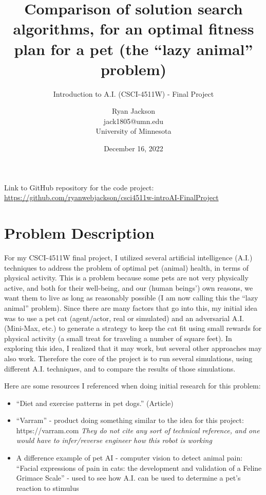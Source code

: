 \documentclass{article}
\title{Comparison of solution search algorithms, for an optimal fitness plan for a pet (the ``lazy animal'' problem)}
\subtitle{Introduction to A.I. (CSCI-4511W) - Final Project}
\author{Ryan Jackson \\ jack1805@umn.edu \\ University of Minnesota}
\date{December 16, 2022}
\begin{document}
\maketitle

Link to GitHub repository for the code project:
\href{https://github.com/ryanwebjackson/csci4511w-introAI-FinalProject}{https://github.com/ryanwebjackson/csci4511w-introAI-FinalProject} 

\section{Problem Description}

For my CSCI-4511W final project, I utilized several artificial intelligence (A.I.) techniques to address the problem of optimal pet (animal) health, in terms of physical activity. This is a problem because some pets are not very physically active, and both for their well-being, and our (human beings') own reasons, we want them to live as long as reasonably possible (I am now calling this the ``lazy animal'' problem). Since there are many factors that go into this, my initial idea was to use a pet cat (agent/actor, real or simulated) and an adversarial A.I. (Mini-Max, etc.) to generate a strategy to keep the cat fit using small rewards for physical activity (a small treat for traveling a number of square feet). In exploring this idea, I realized that it may work, but several other approaches may also work. Therefore the core of the project is to run several simulations, using different A.I. techniques, and to compare the results of those simulations.

Here are some resources I referenced when doing initial research for this problem:
\begin{itemize}
    \item ``Diet and exercise patterns in pet dogs.'' (Article) \cite{slater1995diet}
    \item ``Varram'' - product doing something similar to the idea for this project: https://varram.com \cite{varram}
    \textit{They do not cite any sort of technical reference, and one would have to infer/reverse engineer how this robot is working}
    \item A difference example of pet AI - computer vision to detect animal pain: ``Facial expressions of pain in cats: the development and validation of a Feline Grimace Scale'' - used to see how A.I. can be used to determine a pet's reaction to stimulus  \cite{evangelista2019}
\end{itemize}
\end{document}
